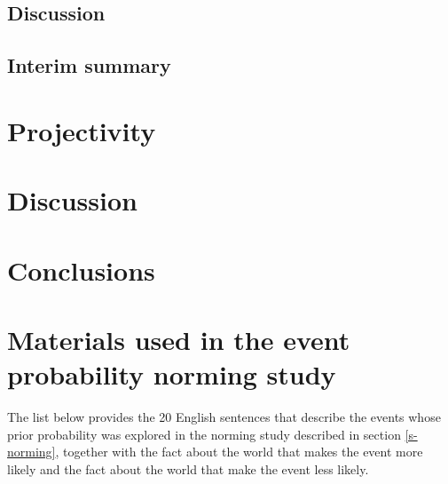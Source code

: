 \documentclass[11pt,fleqn]{article}
\newcommand{\6}{\mbox{$[\hspace*{-.6mm}[$}}
\newcommand{\9}{\mbox{$]\hspace*{-.6mm}]$}}
\begin{document}
\subsection{Discussion}

\subsection{Interim summary}

\section{Projectivity}

\section{Discussion}

\section{Conclusions}\label{s6}


\appendix

\setcounter{table}{0}
\renewcommand{\thetable}{A\arabic{table}}

\setcounter{figure}{0}
\renewcommand{\thefigure}{A\arabic{figure}}

\section{Materials used in the event probability norming study}\label{a-exp1}

The list below provides the 20 English sentences that describe the events whose prior probability was explored in the norming study described in section \ref{s-norming}, together with the fact about the world that makes the event more likely and the fact about the world that make the event less likely.
\end{document}
